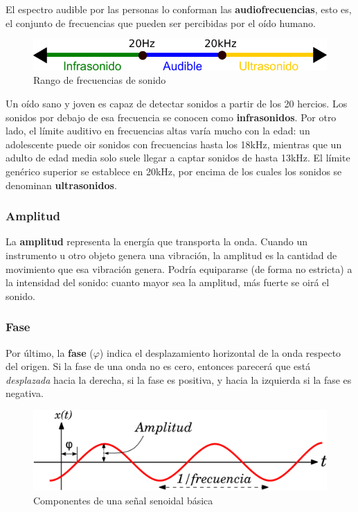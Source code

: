 El espectro audible por las personas lo conforman las
\textbf{audiofrecuencias}, esto es, el conjunto de frecuencias que
pueden ser percibidas por el oído humano. 

\begin{figure}[h]
  \centering
  \includegraphics[scale=0.8]{desarrollo/rango_freq}
  \caption{Rango de frecuencias de sonido}
\end{figure}


Un oído sano y joven es capaz de detectar sonidos a partir de los 20
hercios. Los sonidos por debajo de esa frecuencia se conocen como
\textbf{infrasonidos}. Por otro lado, el límite auditivo en
frecuencias altas varía mucho con la edad: un adolescente puede oir
sonidos con frecuencias hasta los 18kHz, mientras que un adulto de
edad media solo suele llegar a captar sonidos de hasta 13kHz. El
límite genérico superior se establece en 20kHz, por encima de los
cuales los sonidos se denominan \textbf{ultrasonidos}.


\subsubsection{Amplitud}
La \textbf{amplitud} representa la energía que transporta la
onda. Cuando un instrumento u otro objeto genera una vibración, la
amplitud es la cantidad de movimiento que esa vibración genera.
Podría equipararse (de forma no estricta) a la intensidad del sonido:
cuanto mayor sea la amplitud, más fuerte se oirá el sonido.

\subsubsection{Fase}
Por último, la \textbf{fase} ($\varphi$) indica el desplazamiento
horizontal de la onda respecto del origen. Si la fase de una onda no
es cero, entonces parecerá que está \textit{desplazada} hacia la
derecha, si la fase es positiva, y hacia la izquierda si la fase es
negativa.
\begin{figure}[h]\centering
    \includegraphics[scale=0.7]{desarrollo/onda}
    \caption{Componentes de una señal senoidal básica}
\end{figure}
